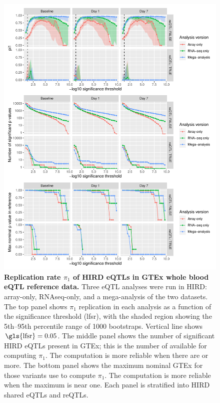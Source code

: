 \begin{figure}
    \centering
    \includegraphics[width=1.0\textwidth,page=1]{mainmatter/figures/chapter_03/compute_pi1.pi1_by_thresholds.pdf}
    \caption[
    ]{
        \textbf{Replication rate $\pi_1$ of \gls{HIRD} \glspl{eQTL} in GTEx whole blood \gls{eQTL} reference data.}
        Three \gls{eQTL} analyses were run in \gls{HIRD}: array-only, \gls{RNAseq}-only, and a mega-analysis of the two datasets.
        The top panel shows $\pi_1$ replication in each analysis as a function of the significance threshold (\gls{lfsr}), with the shaded region showing the 5th--95th percentile range of 1000 bootstraps.
        Vertical line shows $\text{\gls{lfsr}} = 0.05$.
        The middle panel shows the number of significant \gls{HIRD} \glspl{eQTL} present in GTEx; this is the number of \pvalues{} available for computing $\pi_1$.
        The computation is more reliable when there are  or more.
        The bottom panel shows the maximum nominal GTEx \pvalue{} for those variants use to compute $\pi_1$.
        The computation is more reliable when the maximum is near one.
        Each panel is stratified into \gls{HIRD} shared \glspl{eQTL} and \glspl{reQTL}.
    }
    \label{fig:hird_reQTL_pi1vsGTExWholeBlood}
\end{figure}

